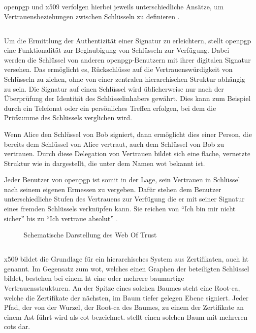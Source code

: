 \gls{openpgp} und \gls{x509} verfolgen hierbei jeweils unterschiedliche Ansätze, um Vertrauensbeziehungen zwischen Schlüsseln zu definieren
\cite{krypto-pki-internet}.

\subsection{}
\label{sec:GrundlagenDefinitionen:Vertrauen:WOT}
Um die Ermittlung der Authentizität einer Signatur zu erleichtern, stellt \gls{openpgp} eine Funktionalität zur Beglaubigung von Schlüsseln zur Verfügung. Dabei
werden die Schlüssel von anderen \gls{openpgp}-Benutzern mit ihrer digitalen Signatur versehen. Das ermöglicht es, Rückschlüsse auf die Vertrauenswürdigkeit
von Schlüsseln zu ziehen, ohne von einer zentralen hierarchischen Struktur abhängig zu sein. Die Signatur auf einen Schlüssel wird üblicherweise nur nach der
Überprüfung der Identität des Schlüsselinhabers gewährt. Dies kann zum Beispiel durch ein Telefonat oder ein persönliches Treffen erfolgen, bei dem die
Prüfsumme des Schlüssels verglichen wird.

Wenn Alice den Schlüssel von Bob signiert, dann ermöglicht dies einer Person, die bereits dem Schlüssel von Alice vertraut, auch dem Schlüssel von Bob zu
vertrauen. Durch diese Delegation von Vertrauen bildet sich eine flache, vernetzte Struktur wie in  dargestellt, die unter dem Namen \gls{wot}
bekannt ist. 

Jeder Benutzer von \gls{openpgp} ist somit in der Lage, sein Vertrauen in Schlüssel nach seinem eigenen Ermessen zu vergeben. Dafür stehen dem
Benutzer unterschiedliche Stufen des Vertrauens zur Verfügung die er mit seiner Signatur eines fremden Schlüssels verknüpfen kann. Sie reichen von "`Ich bin mir
nicht sicher"' bis zu "`Ich vertraue absolut"' \cite{pgp}.

\begin{figure}
\centering

\caption{Schematische Darstellung des Web Of Trust}
\label{fig:wot}
\end{figure}

\subsection{}
\label{sec:GrundlagenDefinitionen:Vertrauen:HT}
\gls{x509} bildet die Grundlage für ein hierarchisches System aus Zertifikaten, auch \gls{ht} genannt. Im Gegensatz zum \gls{wot}, welches einen Graphen der
beteiligten Schlüssel bildet, bestehen bei einem \gls{ht} eine oder mehrere baumartige Vertrauensstrukturen.
An der Spitze eines solchen Baumes steht eine Root-\gls{ca}, welche die Zertifikate der nächsten, im Baum tiefer gelegen Ebene signiert. Jeder Pfad, der von der
Wurzel, der Root-\gls{ca} des Baumes, zu einem der Zertifikate an einem Ast führt wird als \gls{cot} bezeichnet.  stellt einen solchen Baum mit
mehreren \glspl{cot} dar.


